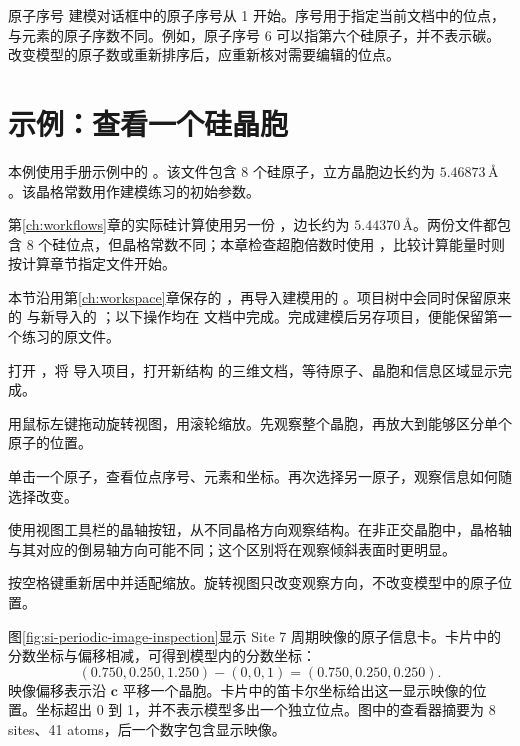 \begin{notebox}{原子序号}
建模对话框中的原子序号从 1 开始。序号用于指定当前文档中的位点，与元素的原子序数不同。例如，原子序号 6 可以指第六个硅原子，并不表示碳。改变模型的原子数或重新排序后，应重新核对需要编辑的位点。
\end{notebox}

\section{示例：查看一个硅晶胞}

本例使用手册示例中的 \mbox{}。该文件包含 8 个硅原子，立方晶胞边长约为 $5.46873\,\text{\AA}$。该晶格常数用作建模练习的初始参数。

第\ref{ch:workflows}章的实际硅计算使用另一份 ，边长约为 $5.44370\,\text{\AA}$。两份文件都包含 8 个硅位点，但晶格常数不同；本章检查超胞倍数时使用 \mbox{}，比较计算能量时则按计算章节指定文件开始。

本节沿用第\ref{ch:workspace}章保存的 ，再导入建模用的 。项目树中会同时保留原来的  与新导入的 ；以下操作均在  文档中完成。完成建模后另存项目，便能保留第一个练习的原文件。

\begin{steps}
  \item 打开 ，将  导入项目，打开新结构  的三维文档，等待原子、晶胞和信息区域显示完成。
  \item 用鼠标左键拖动旋转视图，用滚轮缩放。先观察整个晶胞，再放大到能够区分单个原子的位置。
  \item 单击一个原子，查看位点序号、元素和坐标。再次选择另一原子，观察信息如何随选择改变。
  \item 使用视图工具栏的晶轴按钮，从不同晶格方向观察结构。在非正交晶胞中，晶格轴与其对应的倒易轴方向可能不同；这个区别将在观察倾斜表面时更明显。
  \item 按空格键重新居中并适配缩放。旋转视图只改变观察方向，不改变模型中的原子位置。
\end{steps}

图\ref{fig:si-periodic-image-inspection}显示 Site 7 周期映像的原子信息卡。卡片中的分数坐标与偏移相减，可得到模型内的分数坐标：
\[
 (0.750,0.250,1.250)-(0,0,1)=(0.750,0.250,0.250).
\]
映像偏移表示沿 $\mathbf c$ 平移一个晶胞。卡片中的笛卡尔坐标给出这一显示映像的位置。坐标超出 0 到 1，并不表示模型多出一个独立位点。图中的查看器摘要为 8 sites、41 atoms，后一个数字包含显示映像。

